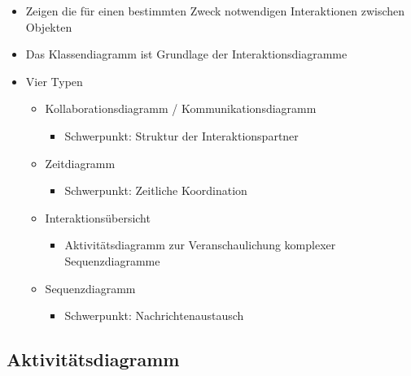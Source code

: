 \begin{itemize}
    \item Zeigen die für einen bestimmten Zweck notwendigen Interaktionen zwischen Objekten
    \item Das Klassendiagramm ist Grundlage der Interaktionsdiagramme
    \item Vier Typen
    \begin{itemize}
        \item Kollaborationsdiagramm / Kommunikationsdiagramm
        \begin{itemize}
            \item Schwerpunkt: Struktur der Interaktionspartner
        \end{itemize}
        \item Zeitdiagramm
        \begin{itemize}
            \item Schwerpunkt: Zeitliche Koordination
        \end{itemize}
        \item Interaktionsübersicht
        \begin{itemize}
            \item Aktivitätsdiagramm zur Veranschaulichung komplexer Sequenzdiagramme
        \end{itemize}
        \item Sequenzdiagramm
        \begin{itemize}
            \item Schwerpunkt: Nachrichtenaustausch
        \end{itemize}
    \end{itemize}
\end{itemize}

\subsection{Aktivitätsdiagramm}


